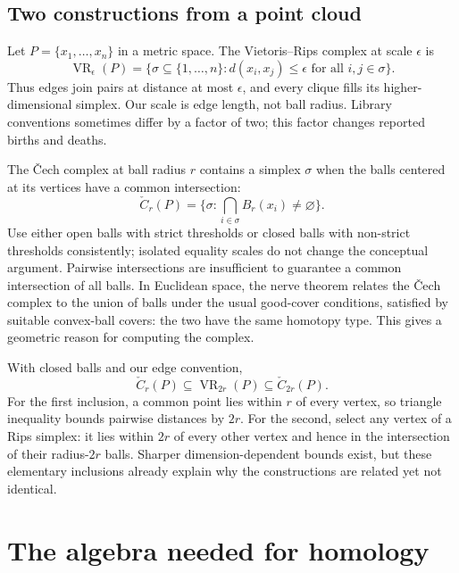 \subsection{Two constructions from a point cloud}
Let $P=\{x_1,\ldots,x_n\}$ in a metric space. The Vietoris--Rips complex at scale $\epsilon$ is
\begin{equation}\label{eq:rips}
\operatorname{VR}_\epsilon(P)=\{\sigma\subseteq\{1,\ldots,n\}:d(x_i,x_j)\leq\epsilon\text{ for all }i,j\in\sigma\}.
\end{equation}
Thus edges join pairs at distance at most $\epsilon$, and every clique fills its higher-dimensional simplex. Our scale is edge length, not ball radius. Library conventions sometimes differ by a factor of two; this factor changes reported births and deaths.

The \v{C}ech complex at ball radius $r$ contains a simplex $\sigma$ when the balls centered at its vertices have a common intersection:
\begin{equation}
\check C_r(P)=\{\sigma:\bigcap_{i\in\sigma}B_r(x_i)\ne\varnothing\}.
\end{equation}
Use either open balls with strict thresholds or closed balls with non-strict thresholds consistently; isolated equality scales do not change the conceptual argument. Pairwise intersections are insufficient to guarantee a common intersection of all balls. In Euclidean space, the nerve theorem relates the \v{C}ech complex to the union of balls under the usual good-cover conditions, satisfied by suitable convex-ball covers: the two have the same homotopy type. This gives a geometric reason for computing the complex.

With closed balls and our edge convention,
\begin{equation}\label{eq:rips-cech}
\check C_r(P)\subseteq\operatorname{VR}_{2r}(P)\subseteq\check C_{2r}(P).
\end{equation}
For the first inclusion, a common point lies within $r$ of every vertex, so triangle inequality bounds pairwise distances by $2r$. For the second, select any vertex of a Rips simplex: it lies within $2r$ of every other vertex and hence in the intersection of their radius-$2r$ balls. Sharper dimension-dependent bounds exist, but these elementary inclusions already explain why the constructions are related yet not identical.

\section{The algebra needed for homology}
